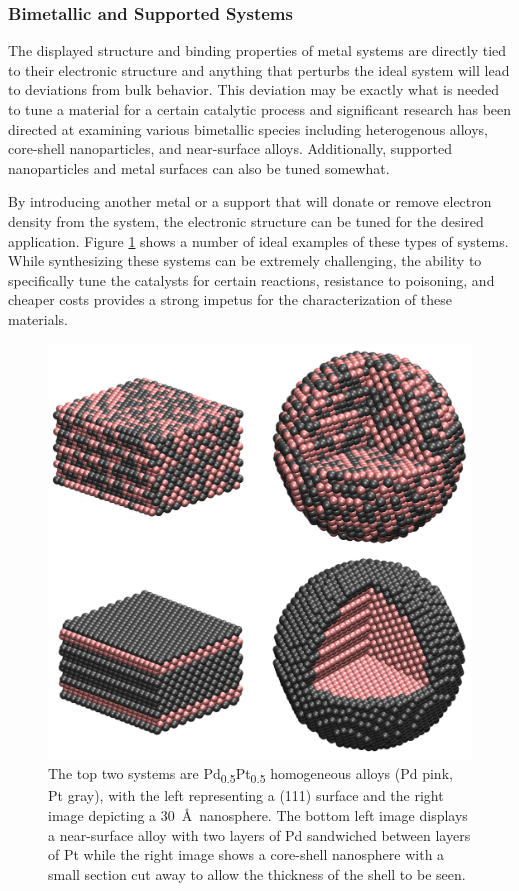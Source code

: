\subsubsection{Bimetallic and Supported Systems}
The displayed structure and binding properties of metal systems are directly
tied to their electronic structure and anything that perturbs the ideal system
will lead to deviations from bulk behavior. This deviation may be exactly what
is needed to tune a material for a certain catalytic process and significant
research has been directed at examining various bimetallic species including
heterogenous alloys, core-shell nanoparticles, and near-surface alloys.
Additionally, supported nanoparticles and metal surfaces can also be tuned
somewhat. 

By introducing another metal or a support that will donate or remove electron
density from the system, the electronic structure can be tuned for the desired
application. Figure \ref{fig:bimetallic} shows a number of ideal examples of
these types of systems. While synthesizing these systems can be extremely
challenging, the ability to specifically tune the catalysts for certain
reactions, resistance to poisoning\citep{Sharma:0ly,Yu:2013fr}, and cheaper
costs\citep{Li:0hl,Zhao:0qf} provides a strong impetus for the characterization
of these materials.

\begin{figure}[p!]
  \includegraphics[width=\linewidth]{../figures/chap1/bimetallic.pdf}
\caption{The top two systems are Pd\textsubscript{0.5}Pt\textsubscript{0.5}
homogeneous alloys (Pd pink, Pt gray), with the left representing a (111) surface
and the right image depicting a 30~\AA\ nanosphere. The bottom left image
displays a near-surface alloy with two layers of Pd sandwiched between layers of
Pt while the right image shows a core-shell nanosphere with a small section cut
away to allow the thickness of the shell to be seen.}
\label{fig:bimetallic} 
\end{figure}

